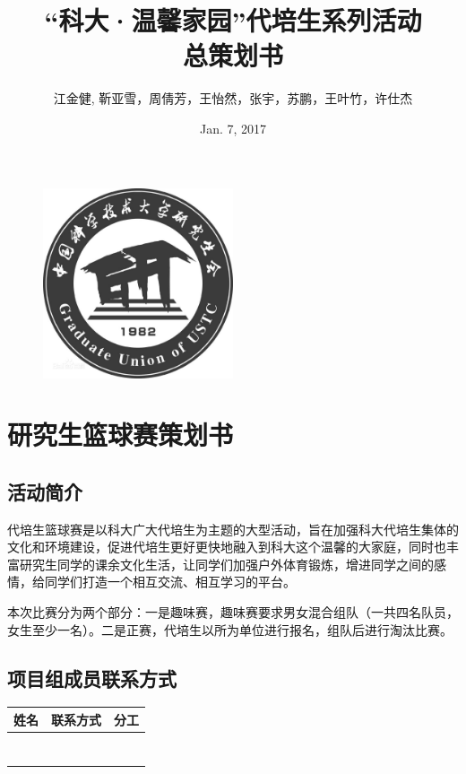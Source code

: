\documentclass{article}
\begin{document}
	\begin{CJK}{UTF8}{gbsn}
		\title{\bf “科大·温馨家园”代培生系列活动\\总策划书}
		\author{江金健, 靳亚雪，周倩芳，王怡然，张宇，苏鹏，王叶竹，许仕杰}
		\date{Jan. 7, 2017}
				\begin{figure}
					\centering
					\includegraphics[width=0.5\textwidth]{logo-wb.jpg}
				\end{figure}
		\maketitle
		\setcounter{page}{0}
		\thispagestyle{empty}
		\newpage
		\tableofcontents
		
		\newpage
		\section{研究生篮球赛策划书}
		\subsection{活动简介}
		代培生篮球赛是以科大广大代培生为主题的大型活动，旨在加强科大代培生集体的文化和环境建设，促进代培生更好更快地融入到科大这个温馨的大家庭，同时也丰富研究生同学的课余文化生活，让同学们加强户外体育锻炼，增进同学之间的感情，给同学们打造一个相互交流、相互学习的平台。
		
		本次比赛分为两个部分：一是趣味赛，趣味赛要求男女混合组队（一共四名队员，女生至少一名）。二是正赛，代培生以所为单位进行报名，组队后进行淘汰比赛。
		
		\subsection{项目组成员联系方式}
		
		\begin{table}[htbp]
			\centering
			\begin{tabular}{|c|c|c|}
				\hline
				姓名 & 联系方式 & 分工\\\hline
				& & \\\hline
				& & \\\hline
				& & \\\hline
				& & \\\hline
				& & \\\hline
				& & \\\hline
				& & \\\hline
			\end{tabular}
		\end{table}
		

\end{CJK}
\end{document}
